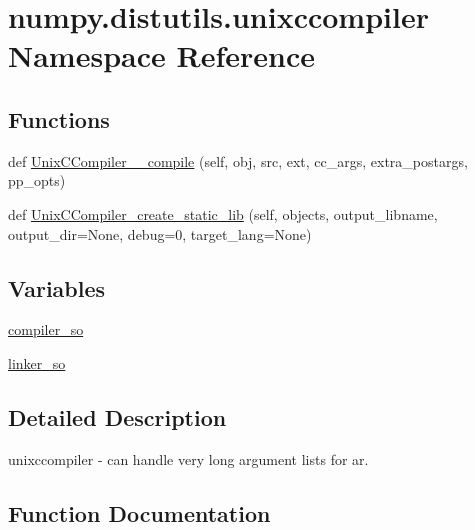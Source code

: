 \hypertarget{namespacenumpy_1_1distutils_1_1unixccompiler}{}\section{numpy.\+distutils.\+unixccompiler Namespace Reference}
\label{namespacenumpy_1_1distutils_1_1unixccompiler}
\subsection*{Functions}
\begin{DoxyCompactItemize}
\item 
def \hyperlink{namespacenumpy_1_1distutils_1_1unixccompiler_a64eba9b5c70e4b0a2c5087188c817de1}{Unix\+C\+Compiler\+\_\+\+\_\+compile} (self, obj, src, ext, cc\+\_\+args, extra\+\_\+postargs, pp\+\_\+opts)
\item 
def \hyperlink{namespacenumpy_1_1distutils_1_1unixccompiler_ad9c1e957f5cc71b1a32be90196b55e43}{Unix\+C\+Compiler\+\_\+create\+\_\+static\+\_\+lib} (self, objects, output\+\_\+libname, output\+\_\+dir=None, debug=0, target\+\_\+lang=None)
\end{DoxyCompactItemize}
\subsection*{Variables}
\begin{DoxyCompactItemize}
\item 
\hyperlink{namespacenumpy_1_1distutils_1_1unixccompiler_a4d031ccc0d3be51da74f486e78eeafed}{compiler\+\_\+so}
\item 
\hyperlink{namespacenumpy_1_1distutils_1_1unixccompiler_a815b2bca69cc58a19ead0fc700e132f6}{linker\+\_\+so}
\end{DoxyCompactItemize}


\subsection{Detailed Description}
\begin{DoxyVerb}unixccompiler - can handle very long argument lists for ar.\end{DoxyVerb}
 

\subsection{Function Documentation}
\mbox{\label{namespacenumpy_1_1distutils_1_1unixccompiler_a64eba9b5c70e4b0a2c5087188c817de1}} 
